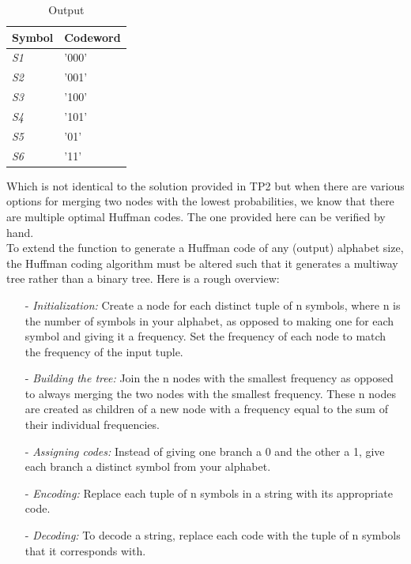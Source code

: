 \documentclass[titlepage]{article}
\begin{document}
\begin{table}[h!]
    \centering
    \small
    \setlength{\tabcolsep}{4pt}
    \begin{tabular}{|p{2cm}|p{2cm}|}
        \hline 
        \textbf{Symbol} & \textbf{Codeword}  \\
        \hline
        \textit{S1} & '000'\\
        \hline
        \textit{S2} & '001'\\
        \hline
        \textit{S3} & '100'\\
        \hline
        \textit{S4} & '101'\\
        \hline
        \textit{S5} & '01'\\
        \hline
        \textit{S6} & '11'\\
        \hline
    \end{tabular}
    \caption{Output}
    \label{tab:q1}
\end{table}
Which is not identical to the solution provided in TP2 but when there are various options for merging two nodes with the lowest probabilities, we know that there are multiple optimal Huffman codes. The one provided here can be verified by hand.\\

To extend the function to generate a Huffman code of any (output) alphabet size, the Huffman coding algorithm must be altered such that it generates a multiway tree rather than a binary tree. Here is a rough overview:
\begin{itemize}
    \item[-] \textit{Initialization:} Create a node for each distinct tuple of n symbols, where n is the number of symbols in your alphabet, as opposed to making one for each symbol and giving it a frequency. Set the frequency of each node to match the frequency of the input tuple.
    \item[-] \textit{Building the tree:} Join the n nodes with the smallest frequency as opposed to always merging the two nodes with the smallest frequency. These n nodes are created as children of a new node with a frequency equal to the sum of their individual frequencies.
    \item[-] \textit{Assigning codes:} Instead of giving one branch a 0 and the other a 1, give each branch a distinct symbol from your alphabet.
    \item[-] \textit{Encoding:} Replace each tuple of n symbols in a string with its appropriate code.
    \item[-] \textit{Decoding:} To decode a string, replace each code with the tuple of n symbols that it corresponds with.
\end{itemize}
\end{document}
